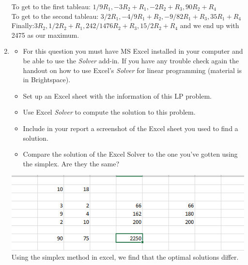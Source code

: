 \documentclass[12pt,english]{article}
\begin{document}
\begin{enumerate}
To get to the first tableau: $1/9R_1, -3R_2 + R_1, -2R_2+R_3, 90R_2+R_4$\\
To get to the second tableau: $3/2R_1, -4/9R_1 + R_2, -9/82R_1+R_3, 35R_1+R_4$\\
Finally:$3R_2, 1/2R_2+R_1, 242/1476R_2+R_3, 15/2R_2+R_4$ and we end up with 
2475 as our maximum. 
\item
    \begin{itemize}
        \item For this question you must have MS Excel installed in your computer and be able to use the \textit{Solver} add-in. If you have any trouble check again the handout on how to use Excel's \textit{Solver} for linear programming (material is in Brightspace).
        \item Set up an Excel sheet with the information of this LP problem.
        \item Use Excel \textit{Solver} to compute the solution to this problem.
        \item Include in your report a screenshot of the Excel sheet you used to find a solution.
        \item Compare the solution of the Excel Solver to the one you've gotten using the simplex. Are they the same?
    \end{itemize}
\includegraphics{number3.png}\\
Using the simplex method in excel, we find that the optimal solutions differ. 
\end{enumerate}
\end{document}

